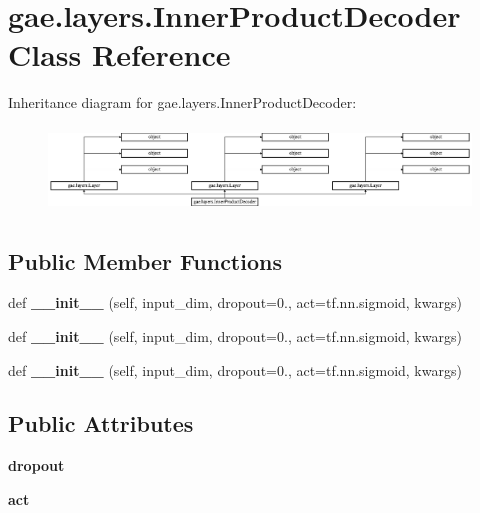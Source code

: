 \hypertarget{classgae_1_1layers_1_1InnerProductDecoder}{}\section{gae.\+layers.\+Inner\+Product\+Decoder Class Reference}
\label{classgae_1_1layers_1_1InnerProductDecoder}
Inheritance diagram for gae.\+layers.\+Inner\+Product\+Decoder\+:\begin{figure}[H]
\begin{center}
\leavevmode
\includegraphics[height=2.265372cm]{classgae_1_1layers_1_1InnerProductDecoder}
\end{center}
\end{figure}
\subsection*{Public Member Functions}
\begin{DoxyCompactItemize}
\item 
\mbox{\label{classgae_1_1layers_1_1InnerProductDecoder_a5473e1808652b65a814f2c2c5279badf}} 
def {\bfseries \+\_\+\+\_\+init\+\_\+\+\_\+} (self, input\+\_\+dim, dropout=0., act=tf.\+nn.\+sigmoid, kwargs)
\item 
\mbox{\label{classgae_1_1layers_1_1InnerProductDecoder_a5473e1808652b65a814f2c2c5279badf}} 
def {\bfseries \+\_\+\+\_\+init\+\_\+\+\_\+} (self, input\+\_\+dim, dropout=0., act=tf.\+nn.\+sigmoid, kwargs)
\item 
\mbox{\label{classgae_1_1layers_1_1InnerProductDecoder_a5473e1808652b65a814f2c2c5279badf}} 
def {\bfseries \+\_\+\+\_\+init\+\_\+\+\_\+} (self, input\+\_\+dim, dropout=0., act=tf.\+nn.\+sigmoid, kwargs)
\end{DoxyCompactItemize}
\subsection*{Public Attributes}
\begin{DoxyCompactItemize}
\item 
\mbox{\label{classgae_1_1layers_1_1InnerProductDecoder_a86be3dbaeb10b5d14934a85ce56f3b38}} 
{\bfseries dropout}
\item 
\mbox{\label{classgae_1_1layers_1_1InnerProductDecoder_a85cacd3487851afbaf96a133146f37b1}} 
{\bfseries act}
\end{DoxyCompactItemize}


